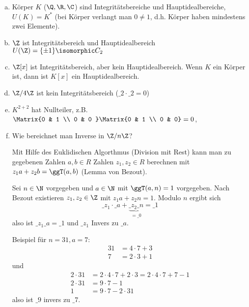 \begin{ex}
	\begin{enumerate}[a)]
		\item
			Körper $K$ ($\Q, \R, \C$) sind Integritätsbereiche und Hauptidealbereiche, $U(K) = K^*$ (bei Körper verlangt man $0 \neq 1$, d.h. Körper haben mindestens zwei Elemente).
		\item
			$\Z$ ist Integritätsbereich und Hauptidealbereich $U(\Z) = \{ \pm 1 \} \isomorphic C_2$
		\item
			$\Z[x]$ ist Integritätsbereich, aber kein Hauptidealbereich.
			Wenn $K$ ein Körper ist, dann ist $K[x]$ ein Hauptidealbereich.
		\item
			$\Z / 4 \Z$ ist kein Integritätsbereich ($\_ 2 \cdot \_ 2 = 0$)
		\item
			$K^{2+2}$ hat Nullteiler, z.B. $\Matrix{0 & 1 \\ 0 & 0 } \Matrix{0 & 1 \\ 0 & 0} = 0$,
		\item
			Wie bereichnet man Inverse in $\Z / n \Z$?

			Mit Hilfe des Euklidischen Algorthmus (Division mit Rest) kann man zu gegebenen Zahlen $a,b \in R$ Zahlen $z_1, z_2 \in R$ berechnen mit $z_1 a + z_2 b = \ggT(a,b)$ (Lemma von Bezout).

			Sei $n \in \N$ vorgegeben und $a \in \N$ mit $\ggT(a, n) = 1$ vorgegeben.
			Nach Bezout existieren $z_1, z_2 \in \Z$ mit $z_1 a + z_2 n = 1$.
			Modulo $n$ ergibt sich
			\[
				\_ z_1 \cdot \_ a + \underbrace{\_ z_2 \_ n}_{=\_ 0} = \_ 1
			\]
			also ist $\_z_1 \_ a = \_ 1$ und $\_ z_1$ Invers zu $\_ a$.

			Beispiel für $n = 31, a = 7$:
			\begin{align*}
				31 &= 4 \cdot 7 + 3 \\
				7 &= 2 \cdot 3 + 1
			\end{align*}
			und
			\begin{align*}
				2 \cdot 31 &= 2 \cdot 4 \cdot 7 + 2 \cdot 3 = 2 \cdot 4 \cdot 7 + 7 - 1 \\
				2 \cdot 31 &= 9 \cdot 7 - 1 \\
				1 &= 9 \cdot 7 - 2 \cdot 31
			\end{align*}
			also ist $\_ 9$ invers zu $\_ 7$.
	\end{enumerate}
\end{ex}


